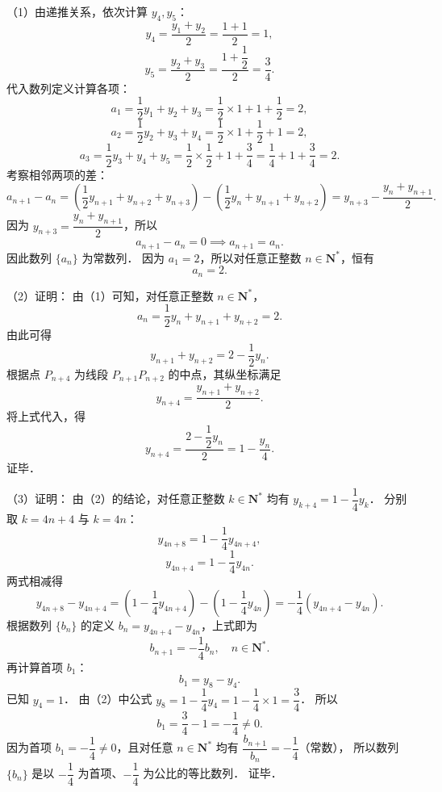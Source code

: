 \begin{answer}
（1）由递推关系，依次计算 $y_4, y_5$：
\nopagebreak[4]
\[
y_4 = \frac{y_1 + y_2}{2} = \frac{1 + 1}{2} = 1,
\]
\nopagebreak[4]
\[
y_5 = \frac{y_2 + y_3}{2} = \frac{1 + \dfrac{1}{2}}{2} = \frac{3}{4}.
\]
代入数列定义计算各项：
\nopagebreak[4]
\[
a_1 = \frac{1}{2}y_1 + y_2 + y_3 = \frac{1}{2} \times 1 + 1 + \frac{1}{2} = 2,
\]
\nopagebreak[4]
\[
a_2 = \frac{1}{2}y_2 + y_3 + y_4 = \frac{1}{2} \times 1 + \frac{1}{2} + 1 = 2,
\]
\nopagebreak[4]
\[
a_3 = \frac{1}{2}y_3 + y_4 + y_5 = \frac{1}{2} \times \frac{1}{2} + 1 + \frac{3}{4} = \frac{1}{4} + 1 + \frac{3}{4} = 2.
\]
考察相邻两项的差：
\nopagebreak[4]
\[
a_{n+1} - a_n = \left(\frac{1}{2}y_{n+1} + y_{n+2} + y_{n+3}\right) - \left(\frac{1}{2}y_n + y_{n+1} + y_{n+2}\right) = y_{n+3} - \frac{y_n + y_{n+1}}{2}.
\]
因为 $y_{n+3} = \dfrac{y_n + y_{n+1}}{2}$，所以
\nopagebreak[4]
\[
a_{n+1} - a_n = 0 \implies a_{n+1} = a_n.
\]
因此数列 $\{a_n\}$ 为常数列．
因为 $a_1 = 2$，所以对任意正整数 $n \in \mathbf{N}^*$，恒有
\nopagebreak[4]
\[
a_n = 2.
\]

（2）证明：
由（1）可知，对任意正整数 $n \in \mathbf{N}^*$，
\nopagebreak[4]
\[
a_n = \frac{1}{2}y_n + y_{n+1} + y_{n+2} = 2.
\]
由此可得
\nopagebreak[4]
\[
y_{n+1} + y_{n+2} = 2 - \frac{1}{2}y_n.
\]
根据点 $P_{n+4}$ 为线段 $P_{n+1} P_{n+2}$ 的中点，其纵坐标满足
\nopagebreak[4]
\[
y_{n+4} = \frac{y_{n+1} + y_{n+2}}{2}.
\]
将上式代入，得
\nopagebreak[4]
\[
y_{n+4} = \frac{2 - \dfrac{1}{2}y_n}{2} = 1 - \frac{y_n}{4}.
\]
证毕．

（3）证明：
由（2）的结论，对任意正整数 $k \in \mathbf{N}^*$ 均有 $y_{k+4} = 1 - \dfrac{1}{4}y_k$．
分别取 $k = 4n + 4$ 与 $k = 4n$：
\nopagebreak[4]
\[
y_{4n+8} = 1 - \frac{1}{4}y_{4n+4},
\]
\nopagebreak[4]
\[
y_{4n+4} = 1 - \frac{1}{4}y_{4n}.
\]
两式相减得
\nopagebreak[4]
\[
y_{4n+8} - y_{4n+4} = \left(1 - \frac{1}{4}y_{4n+4}\right) - \left(1 - \frac{1}{4}y_{4n}\right) = -\frac{1}{4}(y_{4n+4} - y_{4n}).
\]
根据数列 $\{b_n\}$ 的定义 $b_n = y_{4n+4} - y_{4n}$，上式即为
\nopagebreak[4]
\[
b_{n+1} = -\frac{1}{4}b_n, \quad n \in \mathbf{N}^*.
\]
再计算首项 $b_1$：
\nopagebreak[4]
\[
b_1 = y_8 - y_4.
\]
已知 $y_4 = 1$．
由（2）中公式 $y_8 = 1 - \dfrac{1}{4}y_4 = 1 - \dfrac{1}{4} \times 1 = \dfrac{3}{4}$．
所以
\nopagebreak[4]
\[
b_1 = \frac{3}{4} - 1 = -\frac{1}{4} \neq 0.
\]
因为首项 $b_1 = -\dfrac{1}{4} \neq 0$，且对任意 $n \in \mathbf{N}^*$ 均有 $\dfrac{b_{n+1}}{b_n} = -\dfrac{1}{4}$（常数），
所以数列 $\{b_n\}$ 是以 $-\dfrac{1}{4}$ 为首项、$-\dfrac{1}{4}$ 为公比的等比数列．
证毕．


\end{answer}